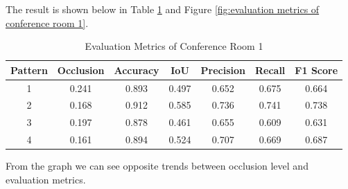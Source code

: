 \documentclass[11pt, a4paper,oneside,chapterprefix=false]{scrbook}
\begin{document}
The result is shown below in Table \ref{tab:evaluation metrics of conference room 1} and Figure \ref{fig:evaluation metrics of conference room 1}.

\begin{table}[H]
    \centering
    \begin{tabular}{|c|c|c|c|c|c|c|}
        \hline
        Pattern & Occlusion & Accuracy & IoU & Precision & Recall & F1 Score \\
        \hline
        1 & 0.241 & 0.893 & 0.497 & 0.652 & 0.675 & 0.664 \\
        2 & 0.168 & 0.912 & 0.585 & 0.736 & 0.741 & 0.738 \\
        3 & 0.197 & 0.878 & 0.461 & 0.655 & 0.609 & 0.631 \\
        4 & 0.161 & 0.894 & 0.524 & 0.707 & 0.669 & 0.687 \\
        \hline
    \end{tabular}
    \caption{Evaluation Metrics of Conference Room 1}
    \label{tab:evaluation metrics of conference room 1}
\end{table}

\vspace{20pt}

From the graph we can see opposite trends between occlusion level and evaluation metrics. 
\end{document}
